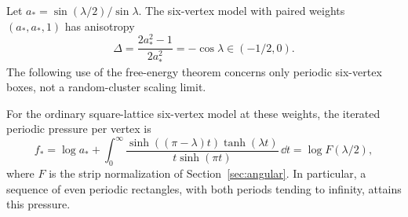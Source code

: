 Let \(a_*=\sin(\lambda/2)/\sin\lambda\). The six-vertex model with
paired weights \((a_*,a_*,1)\) has anisotropy
\[
 \Delta=\frac{2a_*^2-1}{2a_*^2}=-\cos\lambda\in(-1/2,0).
\]
The following use of the free-energy theorem concerns only periodic
six-vertex boxes, not a random-cluster scaling limit.

\begin{lemma}
\label{physical:pressure}
For the ordinary square-lattice six-vertex model at these weights,
the iterated periodic pressure per vertex is
\begin{equation}\label{physical:free-energy}
 f_* = \log a_*+
 \int_0^\infty
 \frac{\sinh((\pi-\lambda)t)\tanh(\lambda t)}
      {t\sinh(\pi t)}\,\dd t
 =\log F(\lambda/2),
\end{equation}
where \(F\) is the strip normalization of Section~\ref{sec:angular}.
In particular, a sequence of even periodic rectangles, with both
periods tending to infinity, attains this pressure.
\end{lemma}

